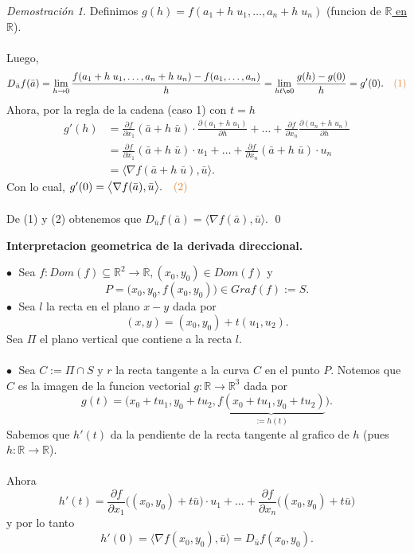 \documentclass{article}
\theoremstyle{definition}
\theoremstyle{remark}
\newtheorem*{demo}{Demostración}
\newcommand\bl{$\bullet\;$}
\begin{document}
\begin{demo}
  Definimos $g(h)=f(a_1+h\;u_1,\dots,a_n+h\;u_n)$ \quad \big(funcion de \underline{$\mathbb{R}$ en $\mathbb{R}$}\big).\\\\
  Luego, \[ 
    D_{\bar{u}}f(\bar{a})=\lim_{h \to 0}{\frac{f(a_1+h \; u_1, \dots , a_n+h \; u_n)-f(a_1,\dots, a_n)}{h}}=\lim_{h t\o 0}{\frac{g(h)-g(0)}{h}}=g'(0). \quad \textcolor{rojop2}{(1)}
  \]
Ahora, por la regla de la cadena (caso 1) con $t=h$ \[
  \begin{aligned}
    g'(h) & = \frac{\partial f }{\partial x_1}(\bar{a}+h \; \bar{u}) \cdot \frac{\partial (a_1+h \; u_1)}{\partial h} + \dots + \frac{\partial f}{\partial x_n}\frac{\partial (a_n+h \; u_n)}{\partial h} \\
          &= \frac{\partial f}{\partial x_1}(\bar{a} + h  \; \bar{u}) \cdot u_1 + \dots + \frac{\partial f}{\partial x_n}(\bar{a}+h \; \bar{u}) \cdot u_n \\
          & = \big\langle \nabla f(\bar{a}+h\;\bar{u}),\bar{u}\big\rangle.
  \end{aligned}
\]
Con lo cual, $g'(0)=\big\langle \nabla f(\bar{a}),\bar{u} \big\rangle. \quad \textcolor{rojop2}{(2)}$ \\\\
De \textcolor{rojop2}{(1)} y \textcolor{rojop2}{(2)} obtenemos que $D_{\bar{u}}f(\bar{a})=\big\langle \nabla f(\bar{a}),\bar{u} \big\rangle$.
  \qed
  \end{demo}
\begin{center}
\textbf{Interpretacion geometrica de la derivada direccional.}
\end{center}
\textcolor{verdep2}{\bl} Sea $f: Dom(f) \subseteq \mathbb{R}^2 \to \mathbb{R}, (x_0,y_0) \in Dom(f)$ y \[
P=\big(x_0,y_0,f(x_0,y_0)\big) \in Graf(f):=S.
\]
\textcolor{verdep2}{\bl} Sea $l$ la recta en el plano $x-y$ dada por \[
  (x,y) = (x_0,y_0)+t(u_1,u_2).
\]
Sea $\Pi$ el plano vertical que contiene a la recta $l$. \\\\
\textcolor{verdep2}{\bl} Sea $C := \Pi \cap S$ y $r$ la recta tangente a la curva $C$ en el punto $P$. Notemos que $C$ es la imagen de la funcion vectorial $g : \mathbb{R} \to \mathbb{R}^3$ dada por \[
  g(t)=\big(x_0+tu_1,y_0+tu_2,\underbrace{f(x_0+tu_1,y_0+tu_2)}_{:= h(t)}\big).
\]
Sabemos que $h'(t)$ da la pendiente de la recta tangente al grafico de $h$ (pues $h : \mathbb{R} \to \mathbb{R}$). \\\\
Ahora \[
h'(t)=\frac{\partial f}{\partial x_1}\big((x_0,y_0)+t\bar{u}\big)\cdot u_1 + \dots + \frac{\partial f}{\partial x_n}\big((x_0,y_0)+t\bar{u}\big)
  \] y por lo tanto \[
  h'(0)=\big\langle \nabla f(x_0,y_0),\bar{u}\big\rangle=D_{\bar{u}}f(x_0,y_0).
\]
\end{document}
